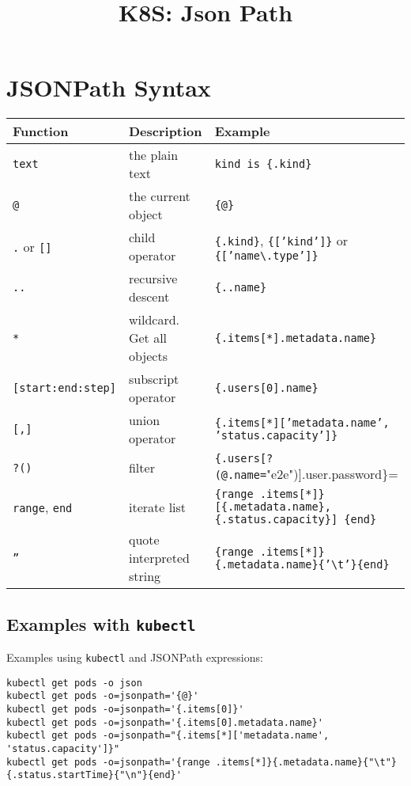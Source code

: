 \documentclass[a4paper,landscape]{article}
\date{}
\title{K8S: Json Path}
\begin{document}
\section{JSONPath Syntax}
\label{sec:org34bbd69}

\begin{center}
\begin{tabular}{lll}
Function & Description & Example\\[0pt]
\hline
\texttt{text} & the plain text & \texttt{kind is \{.kind\}}\\[0pt]
\texttt{@} & the current object & \texttt{\{@\}}\\[0pt]
\texttt{.} or \texttt{[]} & child operator & \texttt{\{.kind\}}, \texttt{\{['kind']\}} or \texttt{\{['name\textbackslash{}.type']\}}\\[0pt]
\texttt{..} & recursive descent & \texttt{\{..name\}}\\[0pt]
\texttt{*} & wildcard. Get all objects & \texttt{\{.items[*].metadata.name\}}\\[0pt]
\texttt{[start:end:step]} & subscript operator & \texttt{\{.users[0].name\}}\\[0pt]
\texttt{[,]} & union operator & \texttt{\{.items[*]['metadata.name', 'status.capacity']\}}\\[0pt]
\texttt{?()} & filter & \texttt{\{.users[?(@.name=}"e2e")].user.password\}=\\[0pt]
\texttt{range}, \texttt{end} & iterate list & \texttt{\{range .items[*]\}[\{.metadata.name\}, \{.status.capacity\}] \{end\}}\\[0pt]
\texttt{''} & quote interpreted string & \texttt{\{range .items[*]\}\{.metadata.name\}\{'\textbackslash{}t'\}\{end\}}\\[0pt]
\end{tabular}
\end{center}

\subsection{Examples with \texttt{kubectl}}
\label{sec:orgebbca79}

Examples using \texttt{kubectl} and JSONPath expressions:

\begin{verbatim}
kubectl get pods -o json
kubectl get pods -o=jsonpath='{@}'
kubectl get pods -o=jsonpath='{.items[0]}'
kubectl get pods -o=jsonpath='{.items[0].metadata.name}'
kubectl get pods -o=jsonpath="{.items[*]['metadata.name', 'status.capacity']}"
kubectl get pods -o=jsonpath='{range .items[*]}{.metadata.name}{"\t"}{.status.startTime}{"\n"}{end}'
\end{verbatim}
\end{document}
